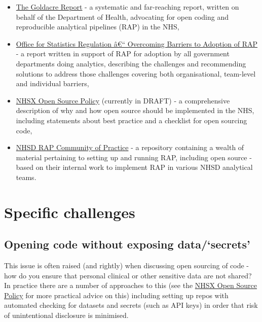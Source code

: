 \documentclass[
]{book}
\providecommand{\tightlist}{%
  \setlength{\itemsep}{0pt}\setlength{\parskip}{0pt}}
\begin{document}
\begin{itemize}
\tightlist
\item
  \href{https://www.gov.uk/government/publications/better-broader-safer-using-health-data-for-research-and-analysis}{The Goldacre Report} - a systematic and far-reaching report, written on behalf of the Department of Health, advocating for open coding and reproducible analytical pipelines (RAP) in the NHS,
\item
  \href{https://osr.statisticsauthority.gov.uk/publication/reproducible-analytical-pipelines-overcoming-barriers-to-adoption/}{Office for Statistics Regulation â€`` Overcoming Barriers to Adoption of RAP} - a report written in support of RAP for adoption by all government departments doing analytics, describing the challenges and recommending solutions to address those challenges covering both organisational, team-level and individual barriers,
\item
  \href{https://github.com/nhsx/open-source-policy}{NHSX Open Source Policy} (currently in DRAFT) - a comprehensive description of why and how open source should be implemented in the NHS, including statements about best practice and a checklist for open sourcing code,
\item
  \href{https://github.com/NHSDigital/rap-community-of-practice}{NHSD RAP Community of Practice} - a repository containing a wealth of material pertaining to setting up and running RAP, including open source - based on their internal work to implement RAP in various NHSD analytical teams.
\end{itemize}

\hypertarget{specific-challenges}{%
\section{Specific challenges}\label{specific-challenges}}

\hypertarget{opening-code-without-exposing-datasecrets}{%
\subsection{Opening code without exposing data/`secrets'}\label{opening-code-without-exposing-datasecrets}}

This issue is often raised (and rightly) when discussing open sourcing of code - how do you ensure that personal clinical or other sensitive data are not shared? In practice there are a number of approaches to this (see the \href{https://github.com/nhsx/open-source-policy}{NHSX Open Source Policy} for more practical advice on this) including setting up repos with automated checking for datasets and secrets (such as API keys) in order that risk of unintentional disclosure is minimised.
\end{document}
